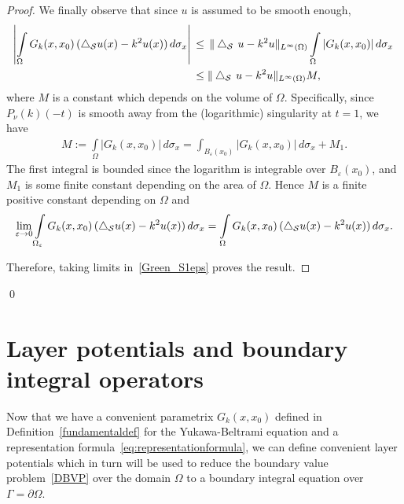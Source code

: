 \begin{proof}
We finally observe that since $u$ is assumed to be smooth enough,
\begin{align*} 
  \left| \int\limits_{\Omega} G_k(x,x_0)\,(\bigtriangleup_{\mathcal{S}} u(x)-k^2u(x)) 
  \, d\sigma_x\right|\,&\leq \,
  \|\bigtriangleup_{\mathcal{S}}\,u -k^2 u\|_{L^{\infty}(\Omega)} 
  \int\limits_{\Omega} |G_k(x,x_0)| \, d\sigma_x\,\\
  & \leq \|\bigtriangleup_{\mathcal{S}}\,u -k^2 u\|_{L^{\infty}(\Omega)}M,
\end{align*}
where $M$ is a constant which depends on the volume of $\Omega$.
Specifically, since $P_\nu(k)(-t)$ is smooth away from the
(logarithmic) singularity at $t=1$, we have 
\begin{align*}
  M := \int\limits_{\Omega} |G_k(x,x_0)| \, d\sigma_x
  = \int_{B_{\varepsilon}(x_0)}|G_k(x,x_0)| \, d\sigma_x + M_1.
\end{align*}
The first integral is bounded since the logarithm is integrable over
${B_{\varepsilon}(x_0)}$, and $M_1$ is some finite constant depending
on the area of $\Omega$. Hence $M$ is a finite positive
constant depending on $\Omega$ and
\begin{align*}
  \lim_{\varepsilon\rightarrow 0}
  \int\limits_{\Omega_{\varepsilon}} G_k(x,x_0)\,(\bigtriangleup_{\mathcal{S}} u(x)
  -k^2u(x)) \,d\sigma_x = \int\limits_{\Omega} G_k(x,x_0)\,
  (\bigtriangleup_{\mathcal{S}} u(x) -k^2u(x))\,d\sigma_x.
\end{align*}

Therefore, taking limits in~\eqref{Green_S1eps} proves the result.
\end{proof}
\qed

\section{Layer potentials and boundary integral operators}
Now that we have a convenient parametrix $G_k(x,x_0)$ defined in
Definition~\ref{fundamentaldef} for the Yukawa-Beltrami equation and a
representation formula~\eqref{eq:representationformula}, we can define
convenient layer potentials which in turn will be used to reduce the
boundary value problem~\eqref{DBVP}  over the domain $\Omega$ to a
boundary integral equation over $\Gamma = \partial \Omega$.


